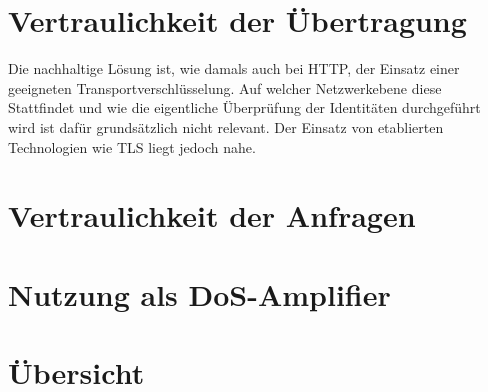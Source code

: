 
\section{ Vertraulichkeit der Übertragung}

Die nachhaltige Lösung ist, wie damals auch bei HTTP, der Einsatz einer geeigneten Transportverschlüsselung. Auf welcher Netzwerkebene diese Stattfindet und wie die eigentliche Überprüfung der Identitäten durchgeführt wird ist dafür grundsätzlich nicht relevant. Der Einsatz von etablierten Technologien wie TLS liegt jedoch nahe.

\section{Vertraulichkeit der Anfragen}


\section{Nutzung als DoS-Amplifier}


\section{Übersicht}
\label{BedrohungenÜbersicht}

